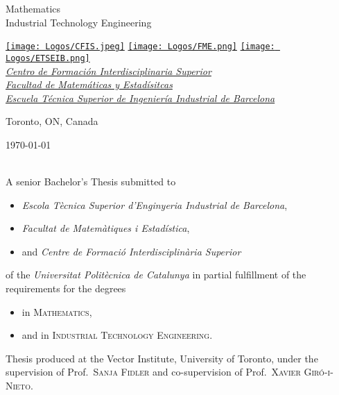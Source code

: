 \begin{titlepage}
  \vfill

  \Large
  Mathematics \\
  Industrial Technology Engineering

  \vfill

  \large
  \href{https://href.com}{\texttt{[image: Logos/CFIS.jpeg]}}
  \hspace{2em}
  \href{https://href.com}{\texttt{[image: Logos/FME.png]}}
  \hspace{2em}
  \href{https://href.com}{\texttt{[image: Logos/ETSEIB.png]}} \\[1ex]
  {\slshape
  \href{https://href.com}{Centro de Formación Interdisciplinaria Superior} \\
  \href{https://href.com}{Facultad de Matemáticas y Estadísitcas} \\
  \href{https://href.com}{Escuela Técnica Superior de Ingeniería Industrial de Barcelona}}

  \vfill

  Toronto, ON, Canada \hfill \@date

  \makeatother
\end{titlepage}


\thispagestyle{plain}
\small
\null\vfill
\begin{sloppypar}
  \makeatletter
  \noindent \@author{} \textcopyright{} \today \\
  \texttt{\@title} \\
  \makeatother
\end{sloppypar}

\noindent A senior Bachelor's Thesis submitted to
\begin{itemize}
  \item \textsl{Escola Tècnica Superior d'Enginyeria Industrial de Barcelona},
  \item \textsl{Facultat de Matemàtiques i Estadística},
  \item and \textsl{Centre de Formació Interdisciplinària Superior}
\end{itemize}
of the \textit{Universitat Politècnica de Catalunya} in partial fulfillment of
the requirements for the degrees
\begin{itemize}
  \item in \textsc{Mathematics},
  \item and in \textsc{Industrial Technology Engineering}.
\end{itemize}

\noindent Thesis produced at the Vector Institute, University of Toronto, under
the supervision of Prof.\ \textsc{Sanja Fidler} and co-supervision of Prof.\
\textsc{Xavier Giró-i-Nieto}.\medskip

